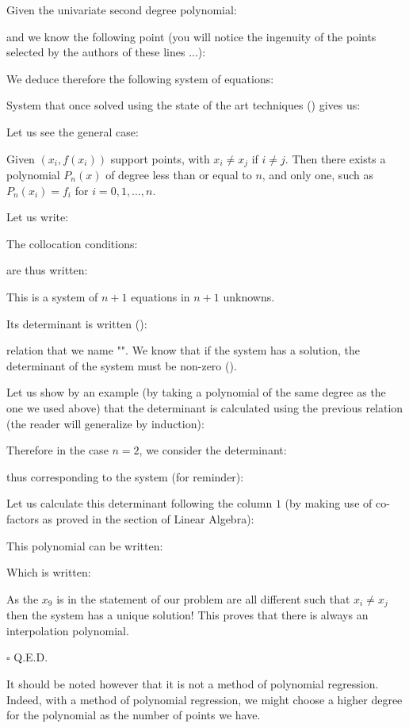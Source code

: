 	Given the univariate second degree polynomial:
	
	and we know the following point (you will notice the ingenuity of the points selected by the authors of these lines ...):
	
	We deduce therefore the following system of equations:
	
	System that once solved using the state of the art techniques () gives us:
	
	Let us see the general case:
	\begin{theorem}
	Given  $(x_i,f(x_i))$  support points, with $x_i\neq x_j$ if $i\neq j$. Then there exists a polynomial $P_n(x)$ of degree less than or equal to $n$, and only one, such as $P_n(x_i)=f_i$ for $i=0,1,...,n$.
	\end{theorem}
	\begin{dem}
	Let us write:
	
	The collocation conditions:
	
	are thus written:
	
	This is a system of $n + 1$ equations in $n + 1$ unknowns.
	
	Its determinant is written ():
	
	relation that we name "". We know that if the system has a solution, the determinant of the system must be non-zero ().
	
	Let us show by an example (by taking a polynomial of the same degree as the one we used above) that the determinant is calculated using the previous relation (the reader will generalize by induction):
	
	Therefore in the case $n=2$, we consider the determinant:
	
	thus corresponding to the system (for reminder):
	
	Let us calculate this determinant following the column $1$ (by making use of co-factors as proved in the section of Linear Algebra):
	
	This polynomial can be written:
	
	Which is written:
	
	As the $x_9$ is in the statement of our problem are all different such that $x_i\neq x_j$ then the system has a unique solution! This proves that there is always an interpolation polynomial.
	\begin{flushright}
		$\square$  Q.E.D.
	\end{flushright}	
	\end{dem}
	It should be noted however that it is not a method of polynomial regression. Indeed, with a method of polynomial regression, we might choose a higher degree for the polynomial as the number of points we have.
	
